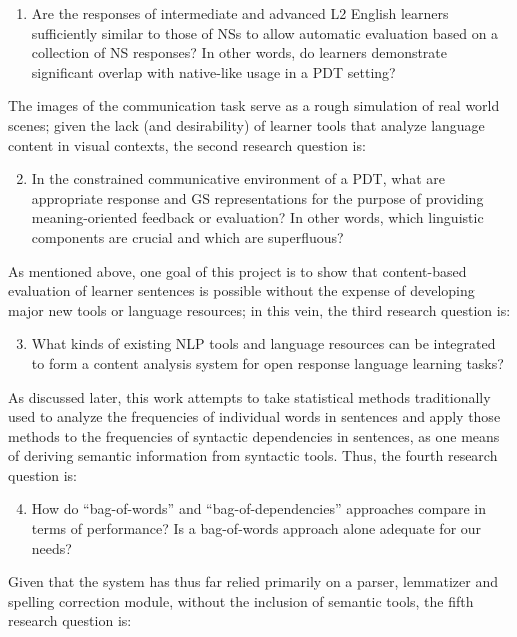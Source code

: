 \begin{enumerate}
\item{Are the responses of intermediate and advanced L2 English learners sufficiently similar to those of NSs to allow automatic evaluation based on a collection of NS responses? In other words, do learners demonstrate significant overlap with native-like usage in a PDT setting?} %
\end{enumerate}
The images of the communication task serve as a rough simulation of real world scenes; given the lack (and desirability) of learner tools that analyze language content in visual contexts, the second research question is:

\begin{enumerate}\setcounter{enumi}{1}
\item{In the constrained communicative environment of a PDT, what are appropriate response and GS representations for the purpose of providing meaning-oriented feedback or evaluation? In other words, which linguistic components are crucial and which are superfluous?}
\end{enumerate}
As mentioned above, one goal of this project is to show that content-based evaluation of learner sentences is possible without the expense of developing major new tools or language resources; in this vein, the third research question is: 

\begin{enumerate}\setcounter{enumi}{2}
\item{What kinds of existing NLP tools and language resources can be integrated to form a content analysis system for open response language learning tasks?}
\end{enumerate}
As discussed later, this work attempts to take statistical methods traditionally used to analyze the frequencies of individual words in sentences and apply those methods to the frequencies of syntactic dependencies in sentences, as one means of deriving semantic information from syntactic tools. Thus, the fourth research question is:

\begin{enumerate}\setcounter{enumi}{3}
\item{How do ``bag-of-words'' and ``bag-of-dependencies'' approaches compare in terms of performance? Is a bag-of-words approach alone adequate for our needs?}
\end{enumerate}
Given that the system has thus far relied primarily on a parser, lemmatizer and spelling correction module, without the inclusion of semantic tools, the fifth research question is: %

